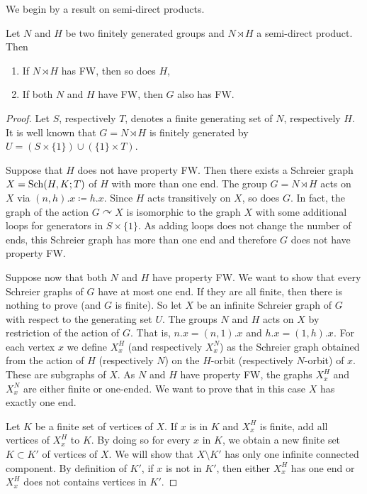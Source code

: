 We begin by a result on semi-direct products.
%
%
\begin{lem}\label{Lemma:Semidirect_ends}
Let $N$ and $H$ be two finitely generated groups and $N\rtimes H$ a semi-direct product.
Then
\begin{enumerate}
\item If $N\rtimes H$ has FW, then so does $H$,
\item If both $N$ and $H$ have FW, then $G$ also has FW.
\end{enumerate}
\end{lem}
%
%
\begin{proof}
Let $S$, respectively $T$, denotes a finite generating set of $N$, respectively $H$.
It is well known that $G=N\rtimes H$ is finitely generated by $U=(S\times\{1\}) \cup(\{1\}\times T)$.

Suppose that $H$ does not have property FW. Then there exists a Schreier graph $X=\operatorname{Sch}(H,K;T)$ of $H$ with more than one end. The group $G=N\rtimes H$ acts on $X$ via $(n,h).x \coloneqq h.x$.
Since $H$ acts transitively on $X$, so does $G$.
In fact, the graph of the action $G \curvearrowright X$ is isomorphic to the graph $X$ with some additional loops for generators in $S\times\{1\}$. As adding loops does not change the number of ends, this Schreier graph has more than one end and therefore $G$ does not have property FW.

Suppose now that both $N$ and $H$ have property FW. We want to show that every Schreier graphs of $G$ have at most one end. If they are all finite, then there is nothing to prove (and $G$ is finite). So let $X$ be an infinite Schreier graph of $G$ with respect to the generating set $U$. The groups $N$ and $H$ acts on $X$ by restriction of the action of $G$. That is, $n.x = (n,1).x$ and $h.x = (1,h).x$.
For each vertex $x$ we define $X_x^H$ (and respectively $X_x^N$) as the Schreier graph obtained from the action of $H$ (respectively $N$) on the $H$-orbit (respectively $N$-orbit) of $x$. These are subgraphs of $X$. As $N$ and $H$ have property FW, the graphs $X_x^H$ and $X_x^N$ are either finite or one-ended. We want to prove that in this case $X$ has exactly one end. 

Let $K$ be a finite set of vertices of $X$.
If $x$ is in $K$ and $X_x^H$ is finite, add all vertices of $X_x^H$ to $K$.
By doing so for every $x$ in $K$, we obtain a new finite set $K\subset K'$ of vertices of $X$.
We will show that $X\setminus K'$ has only one infinite connected component.
By definition of $K'$, if $x$ is not in $K'$, then either $X_x^H$ has one end or $X_x^H$ does not contains vertices in $K'$. 


\end{proof}
